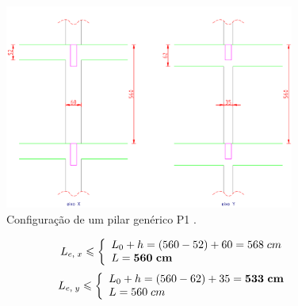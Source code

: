 \begin{figure}[H]
	\begin{center}
	\caption{Configuração de um pilar genérico P1 .}
    	\includegraphics[width=0.85\textwidth]{Comprimento-equivalente/Imagens/Comprimento-equivalente-exercicio.png}
	\end{center}
\end{figure}
$$
	L_{e,\;x}\leqslant\left\{
		\begin{array}{ll}
		L_0+h=(560-52)+60=568\;cm \\
		L=\textbf{560\;cm}
		\end{array}\right.
$$
$$
	L_{e,\;y}\leqslant\left\{
		\begin{array}{ll}
		L_0+h=(560-62)+35=\textbf{533\;cm} \\
		L=560\;cm
		\end{array}\right.
$$

